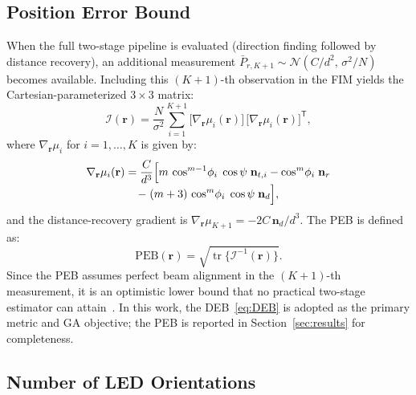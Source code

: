 \documentclass[journal]{IEEEtran}
\begin{document}
\subsection{Position Error Bound}
\label{subsec:PEB}
When the full two-stage pipeline is evaluated (direction finding followed by distance recovery), an additional measurement $\bar P_{r,K+1}\sim\mathcal{N}(C/d^2,\,\sigma^2/N)$ becomes available.  Including this $(K{+}1)$-th observation in the FIM yields the Cartesian-parameterized $3\times3$ matrix:
\begin{equation}
\mathcal{I}(\mathbf r)
= \frac{N}{\sigma^{2}}
  \sum_{i=1}^{K+1}
  \bigl[\nabla_{\mathbf r}\mu_i(\mathbf r)\bigr]\,
  \bigl[\nabla_{\mathbf r}\mu_i(\mathbf r)\bigr]^{\!\mathsf T},
\label{eq:FIM_general}
\end{equation}
where $\nabla_{\mathbf r}\mu_i$ for $i=1,\ldots,K$ is given by:
\begin{multline}
    \nabla_{\mathbf r}\mu_i(\mathbf r)
    = \frac{C}{d^{3}}
      \Bigl[
        m\,\cos^{m-1}\!\phi_i\;\cos\psi\;\mathbf n_{t,i}
        -
        \cos^{m}\!\phi_i\;\mathbf n_{r}
    \\[-3pt]
        -\;
        (m+3)\,\cos^{m}\!\phi_i\;\cos\psi\;\mathbf n_{d}
      \Bigr],
    \label{eq:grad_mu_closed}
\end{multline}
and the distance-recovery gradient is $\nabla_{\mathbf r}\mu_{K+1} = -2C\,\mathbf n_d/d^3$.  The PEB is defined as:
\begin{equation}
\mathrm{PEB}(\mathbf r)
= \sqrt{\operatorname{tr}\!\bigl\{\mathcal{I}^{-1}(\mathbf r)\bigr\}}.
\label{eq:PEB}
\end{equation}
Since the PEB assumes perfect beam alignment in the $(K{+}1)$-th measurement, it is an optimistic lower bound that no practical two-stage estimator can attain~\cite{Kay1993}.  In this work, the DEB~\eqref{eq:DEB} is adopted as the primary metric and GA objective; the PEB is reported in Section~\ref{sec:results} for completeness.

\subsection{Number of LED Orientations}
\label{subsec:Kchoice}
\end{document}
